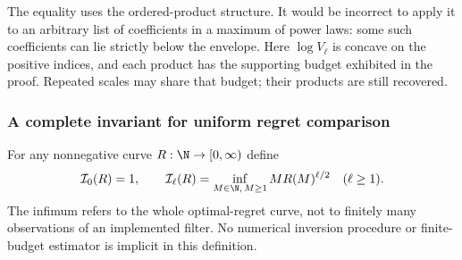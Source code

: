 The equality uses the ordered-product structure. It would be incorrect
to apply it to an arbitrary list of coefficients in a maximum of power
laws: some such coefficients can lie strictly below the envelope. Here
$\log V_\ell$ is concave on the positive indices, and each product
has the supporting budget exhibited in the proof. Repeated scales may
share that budget; their products are still recovered.

\subsubsection{A complete invariant for uniform regret comparison}
For any nonnegative curve $R:\N\to[0,\infty)$ define
\begin{equation}\label{eq:operational-volume-transform}
 \mathcal I_0(R)=1,\qquad
 \mathcal I_\ell(R)=\inf_{M\in\N,\,M\ge1}
                       M R(M)^{\ell/2}\quad(\ell\ge1).
\end{equation}
The infimum refers to the whole optimal-regret curve, not to finitely
many observations of an implemented filter. No numerical inversion
procedure or finite-budget estimator is implicit in this definition.

